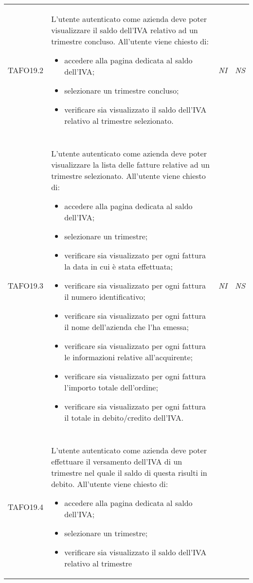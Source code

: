 \begin{longtable}{ >{\centering}p{} >{}p{}
			>{\centering}p{} >{\centering}p{}}
\hypertarget{TAFO19.2}{TAFO19.2} & L'utente autenticato come azienda deve poter visualizzare il saldo dell'IVA
		 relativo ad un trimestre concluso. All'utente viene chiesto di:
		 \begin{itemize}
		 	\item accedere alla pagina dedicata al saldo dell'IVA;
		 	\item selezionare un trimestre concluso;
		 	\item verificare sia visualizzato il saldo dell'IVA relativo al trimestre
		 	selezionato.
		 \end{itemize} & \textit{NI} & \textit{NS}\\ \tabularnewline
\hypertarget{TAFO19.3}{TAFO19.3} & L'utente autenticato come azienda deve poter visualizzare la lista delle
		 fatture relative ad un trimestre selezionato. All'utente viene chiesto di:
		 \begin{itemize}
		 	\item accedere alla pagina dedicata al saldo dell'IVA;
		 	\item selezionare un trimestre;
		 	\item verificare sia visualizzato per ogni fattura la data in cui è stata
		 	effettuata;
		 	\item verificare sia visualizzato per ogni fattura il numero identificativo;
		 	\item verificare sia visualizzato per ogni fattura il nome dell'azienda che
		 	l'ha emessa;
		 	\item verificare sia visualizzato per ogni fattura le informazioni relative
		 	all'acquirente;
		 	\item verificare sia visualizzato per ogni fattura l'importo totale
		 	dell'ordine;
		 	\item verificare sia visualizzato per ogni fattura il totale in debito/credito
		 	dell'IVA.
		 \end{itemize} & \textit{NI} & \textit{NS}\\ \tabularnewline
\hypertarget{TAFO19.4}{TAFO19.4} & L'utente autenticato come azienda deve poter effettuare il versamento 
		 dell'IVA di un trimestre nel quale il saldo di questa risulti in debito. All'utente 
		 viene chiesto di:
		 \begin{itemize}
		 	\item accedere alla pagina dedicata al saldo dell'IVA;
		 	\item selezionare un trimestre;
		 	\item verificare sia visualizzato il saldo dell'IVA relativo al trimestre

\end{itemize}
\end{longtable}
